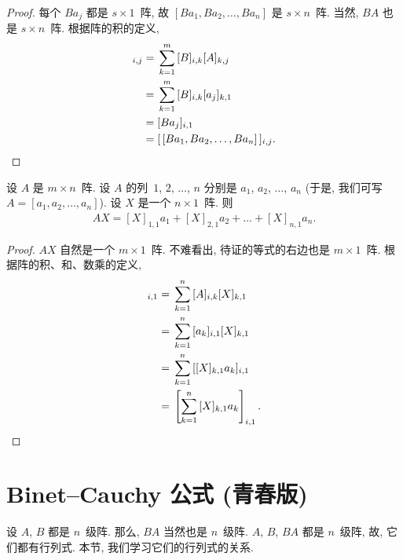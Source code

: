 \documentclass[../libro.tex]{subfiles}
\begin{document}
\begin{proof}
    每个 \(Ba_j\) 都是 \(s \times 1\)~阵,
    故 \([Ba_1, Ba_2, \dots, Ba_n]\) 是 \(s \times n\)~阵.
    当然, \(BA\) 也是 \(s \times n\)~阵.
    根据阵的积的定义,
    \begin{align*}
        [BA]_{i,j}
        = {} & \sum_{k = 1}^{m} {[B]_{i,k} [A]_{k,j}}
        \\
        = {} & \sum_{k = 1}^{m} {[B]_{i,k} [a_j]_{k,1}}
        \\
        = {} & [Ba_j]_{i,1}
        \\
        = {} & [\, [Ba_1, Ba_2, \dots, Ba_n] \,]_{i,j}.
        \qedhere
    \end{align*}
\end{proof}

\begin{theorem}
    设 \(A\) 是 \(m \times n\)~阵.
    设 \(A\) 的列~\(1\), \(2\), \(\dots\), \(n\)
    分别是 \(a_1\), \(a_2\), \(\dots\), \(a_n\)
    (于是, 我们可写 \(A = [a_1, a_2, \dots, a_n]\)).
    设 \(X\) 是一个 \(n \times 1\)~阵.
    则
    \begin{align*}
        AX = [X]_{1,1} a_1 + [X]_{2,1} a_2 + \dots
        + [X]_{n,1} a_n.
    \end{align*}
\end{theorem}

\begin{proof}
    \(AX\) 自然是一个 \(m \times 1\)~阵.
    不难看出, 待证的等式的右边也是 \(m \times 1\)~阵.
    根据阵的积、和、数乘的定义,
    \begin{align*}
        [AX]_{i,1}
        = {} & \sum_{k = 1}^{n} {[A]_{i,k} [X]_{k,1}}
        \\
        = {} & \sum_{k = 1}^{n} {[a_k]_{i,1} [X]_{k,1}}
        \\
        = {} & \sum_{k = 1}^{n} {[[X]_{k,1} a_k]_{i,1}}
        \\
        = {} & \left[ \sum_{k = 1}^{n} {[X]_{k,1}
        a_k } \right]_{i,1}.
        \qedhere
    \end{align*}
\end{proof}

\section{Binet--Cauchy 公式 (青春版)}

设 \(A\), \(B\) 都是 \(n\)~级阵.
那么, \(BA\) 当然也是 \(n\)~级阵.
\(A\), \(B\), \(BA\) 都是 \(n\)~级阵,
故, 它们都有行列式.
本节, 我们学习它们的行列式的关系.
\end{document}
